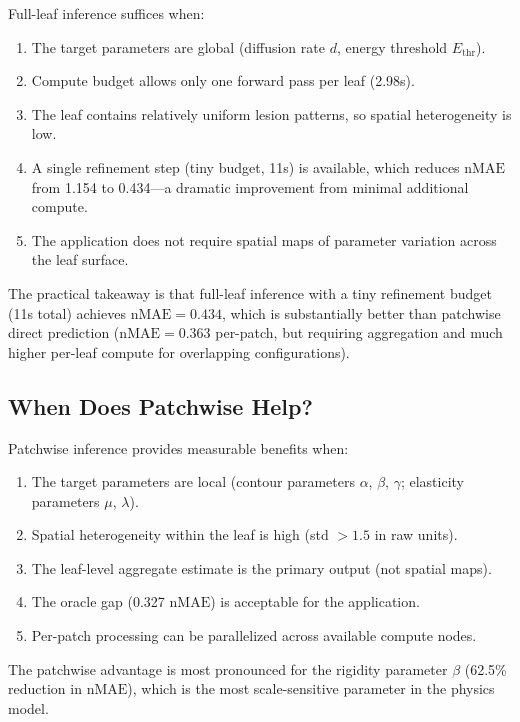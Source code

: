 \documentclass[11pt,a4paper]{article}
\newcommand{\nMAE}{\mathrm{nMAE}}
\begin{document}
Full-leaf inference suffices when:
\begin{enumerate}[nosep]
    \item The target parameters are global (diffusion rate $d$, energy threshold $E_\mathrm{thr}$).
    \item Compute budget allows only one forward pass per leaf (2.98s).
    \item The leaf contains relatively uniform lesion patterns, so spatial heterogeneity is low.
    \item A single refinement step (tiny budget, 11s) is available, which reduces $\nMAE$ from 1.154 to 0.434---a dramatic improvement from minimal additional compute.
    \item The application does not require spatial maps of parameter variation across the leaf surface.
\end{enumerate}

The practical takeaway is that full-leaf inference with a tiny refinement budget (11s total) achieves $\nMAE = 0.434$, which is substantially better than patchwise direct prediction ($\nMAE = 0.363$ per-patch, but requiring aggregation and much higher per-leaf compute for overlapping configurations).

\subsection{When Does Patchwise Help?}

Patchwise inference provides measurable benefits when:
\begin{enumerate}[nosep]
    \item The target parameters are local (contour parameters $\alpha$, $\beta$, $\gamma$; elasticity parameters $\mu$, $\lambda$).
    \item Spatial heterogeneity within the leaf is high (std $> 1.5$ in raw units).
    \item The leaf-level aggregate estimate is the primary output (not spatial maps).
    \item The oracle gap (0.327 $\nMAE$) is acceptable for the application.
    \item Per-patch processing can be parallelized across available compute nodes.
\end{enumerate}

The patchwise advantage is most pronounced for the rigidity parameter $\beta$ (62.5\% reduction in $\nMAE$), which is the most scale-sensitive parameter in the physics model.
\end{document}

